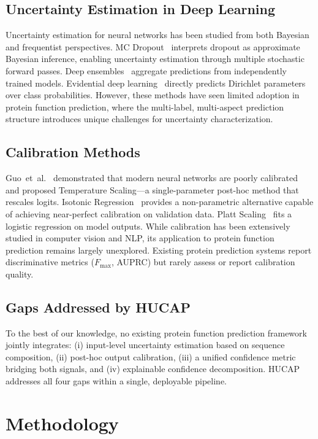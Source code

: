 \documentclass[conference]{IEEEtran}
\begin{document}
\subsection{Uncertainty Estimation in Deep Learning}
Uncertainty estimation for neural networks has been studied from both Bayesian and frequentist perspectives. MC Dropout~\cite{gal2016} interprets dropout as approximate Bayesian inference, enabling uncertainty estimation through multiple stochastic forward passes. Deep ensembles~\cite{lakshminarayanan2017} aggregate predictions from independently trained models. Evidential deep learning~\cite{sensoy2018} directly predicts Dirichlet parameters over class probabilities. However, these methods have seen limited adoption in protein function prediction, where the multi-label, multi-aspect prediction structure introduces unique challenges for uncertainty characterization.

\subsection{Calibration Methods}
Guo~et~al.~\cite{guo2017} demonstrated that modern neural networks are poorly calibrated and proposed Temperature Scaling---a single-parameter post-hoc method that rescales logits. Isotonic Regression~\cite{zadrozny2002} provides a non-parametric alternative capable of achieving near-perfect calibration on validation data. Platt Scaling~\cite{platt1999} fits a logistic regression on model outputs. While calibration has been extensively studied in computer vision and NLP, its application to protein function prediction remains largely unexplored. Existing protein prediction systems report discriminative metrics ($F_{\max}$, AUPRC) but rarely assess or report calibration quality.

\subsection{Gaps Addressed by HUCAP}
To the best of our knowledge, no existing protein function prediction framework jointly integrates: (i) input-level uncertainty estimation based on sequence composition, (ii) post-hoc output calibration, (iii) a unified confidence metric bridging both signals, and (iv) explainable confidence decomposition. HUCAP addresses all four gaps within a single, deployable pipeline.

\section{Methodology}
\end{document}
